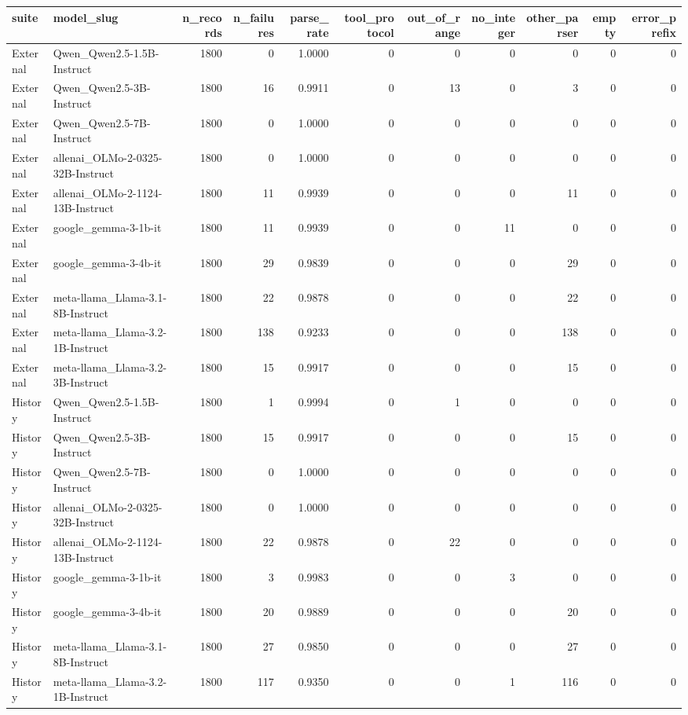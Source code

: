 \begin{tabular}{llrrrrrrrrr}
\toprule
suite & model_slug & n_records & n_failures & parse_rate & tool_protocol & out_of_range & no_integer & other_parser & empty & error_prefix \\
\midrule
External & Qwen_Qwen2.5-1.5B-Instruct & 1800 & 0 & 1.0000 & 0 & 0 & 0 & 0 & 0 & 0 \\
External & Qwen_Qwen2.5-3B-Instruct & 1800 & 16 & 0.9911 & 0 & 13 & 0 & 3 & 0 & 0 \\
External & Qwen_Qwen2.5-7B-Instruct & 1800 & 0 & 1.0000 & 0 & 0 & 0 & 0 & 0 & 0 \\
External & allenai_OLMo-2-0325-32B-Instruct & 1800 & 0 & 1.0000 & 0 & 0 & 0 & 0 & 0 & 0 \\
External & allenai_OLMo-2-1124-13B-Instruct & 1800 & 11 & 0.9939 & 0 & 0 & 0 & 11 & 0 & 0 \\
External & google_gemma-3-1b-it & 1800 & 11 & 0.9939 & 0 & 0 & 11 & 0 & 0 & 0 \\
External & google_gemma-3-4b-it & 1800 & 29 & 0.9839 & 0 & 0 & 0 & 29 & 0 & 0 \\
External & meta-llama_Llama-3.1-8B-Instruct & 1800 & 22 & 0.9878 & 0 & 0 & 0 & 22 & 0 & 0 \\
External & meta-llama_Llama-3.2-1B-Instruct & 1800 & 138 & 0.9233 & 0 & 0 & 0 & 138 & 0 & 0 \\
External & meta-llama_Llama-3.2-3B-Instruct & 1800 & 15 & 0.9917 & 0 & 0 & 0 & 15 & 0 & 0 \\
History & Qwen_Qwen2.5-1.5B-Instruct & 1800 & 1 & 0.9994 & 0 & 1 & 0 & 0 & 0 & 0 \\
History & Qwen_Qwen2.5-3B-Instruct & 1800 & 15 & 0.9917 & 0 & 0 & 0 & 15 & 0 & 0 \\
History & Qwen_Qwen2.5-7B-Instruct & 1800 & 0 & 1.0000 & 0 & 0 & 0 & 0 & 0 & 0 \\
History & allenai_OLMo-2-0325-32B-Instruct & 1800 & 0 & 1.0000 & 0 & 0 & 0 & 0 & 0 & 0 \\
History & allenai_OLMo-2-1124-13B-Instruct & 1800 & 22 & 0.9878 & 0 & 22 & 0 & 0 & 0 & 0 \\
History & google_gemma-3-1b-it & 1800 & 3 & 0.9983 & 0 & 0 & 3 & 0 & 0 & 0 \\
History & google_gemma-3-4b-it & 1800 & 20 & 0.9889 & 0 & 0 & 0 & 20 & 0 & 0 \\
History & meta-llama_Llama-3.1-8B-Instruct & 1800 & 27 & 0.9850 & 0 & 0 & 0 & 27 & 0 & 0 \\
History & meta-llama_Llama-3.2-1B-Instruct & 1800 & 117 & 0.9350 & 0 & 0 & 1 & 116 & 0 & 0 \\

\end{tabular}
